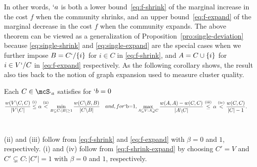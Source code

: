 In other words, $`a$ is both a lower bound~\eqref{eq:f-shrink} of the marginal increase in the cost
$f$ when the community shrinks, and an upper bound~\eqref{eq:f-expand} of the marginal decrease in
the cost $f$ when the community expands. The above theorem can be viewed as a generalization of
Proposition~\ref{pro:single-deviation} because \eqref{eq:single-shrink} and \eqref{eq:single-expand}
are the special cases when we further impose $B=C`/\{i\}$ for $i\in C$ in \eqref{eq:f-shrink}, and
$A=C\cup \{i\}$ for $i\in V`/C$ in \eqref{eq:f-expand} respectively. As the following corollary
shows, the result also ties back to the notion of graph expansion used to measure cluster quality.

\begin{corollary}
  Each $C\in \mcS_{`a}$ satisfies for $`b=0$
  \begin{subequations}
    \begin{align}
      \label{eq:bound-beta0}
      \frac{w(V\backslash C, C)}{|V\backslash C|} 
      &
        \stackrel{ \rm{(i)} }{\leq}
        \alpha
        \stackrel{ \rm{(ii)} }{<}
        \min_{B\subsetneq C: |B| \geq 1} \frac{w(C\backslash B, B)}{|C\backslash B|} 
    \end{align}
    and, for $`b=1$,
    \begin{align}
      \label{eq:bound-beta1}
      \max_{A\subseteq V: A\supsetneq C} \frac{w(A,A)-w(C,C)}{|A\backslash C|}  
      &
        \stackrel{ \rm{(iii)} }{\leq}
        \alpha
        \stackrel{ \rm{(iv)} }{<}
        \frac{w(C, C)}{|C|-1}. 
    \end{align}
  \end{subequations}
  ~\relax
\end{corollary}
\begin{Proof}
  (ii) and (iii) follow from \eqref{eq:f-shrink} and \eqref{eq:f-expand} with $\beta=0$ and $1$,
  respectively. (i) and (iv) follow from \eqref{eq:f-shrink-expand} by choosing
	$C' = V$ 
	and
	$C'\subsetneq C:|C'|=1$
	with $\beta = 0$ and $1$, respectively.
\end{Proof}

